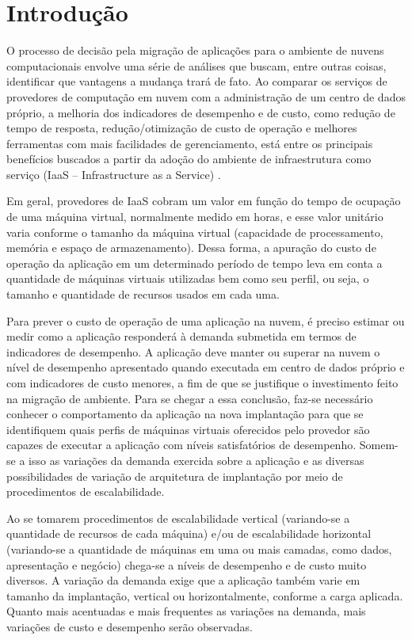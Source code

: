 \chapter[Introdução]{Introdução}
O processo de decisão pela migração de aplicações para o ambiente de nuvens computacionais 
envolve uma série de análises que buscam, entre outras coisas, identificar que vantagens a 
mudança trará de fato. Ao comparar os serviços de provedores de computação em nuvem com a 
administração de um centro de dados próprio, a melhoria dos indicadores de desempenho e de 
custo, como redução de tempo de resposta, redução/otimização de custo de operação e melhores 
ferramentas com mais facilidades de gerenciamento, está entre os principais benefícios buscados 
a partir da adoção do ambiente de infraestrutura como serviço (IaaS – Infrastructure as a Service)
\cite{li2011cloudprophet, rodero2010infrastructure}.

Em geral, provedores de IaaS cobram um valor em função do tempo de ocupação de uma máquina 
virtual, normalmente medido em horas, e esse valor unitário varia conforme o tamanho da máquina 
virtual (capacidade de processamento, memória e espaço de armazenamento). Dessa forma, a apuração 
do custo de operação da aplicação em um determinado período de tempo leva em conta a quantidade 
de máquinas virtuais utilizadas bem como seu perfil, ou seja, o tamanho e quantidade de recursos 
usados em cada uma.
 
Para prever o custo de operação de uma aplicação na nuvem, é preciso estimar ou medir como a 
aplicação responderá à demanda submetida em termos de indicadores de desempenho. A aplicação deve 
manter ou superar na nuvem o nível de desempenho apresentado quando executada em centro de dados 
próprio e com indicadores de custo menores, a fim de que se justifique o investimento feito na 
migração de ambiente. Para se chegar a essa conclusão, faz-se necessário conhecer o comportamento 
da aplicação na nova implantação para que se identifiquem quais perfis de máquinas virtuais 
oferecidos pelo provedor são capazes de executar a aplicação com níveis satisfatórios de desempenho. 
Somem-se a isso as variações da demanda exercida sobre a aplicação e as diversas possibilidades de 
variação de arquitetura de implantação por meio de procedimentos de escalabilidade.
 
Ao se tomarem procedimentos de escalabilidade vertical (variando-se a quantidade de recursos de 
cada máquina) e/ou de escalabilidade horizontal (variando-se a quantidade de máquinas em uma ou 
mais camadas, como dados, apresentação e negócio) chega-se a níveis de desempenho e de custo muito 
diversos. A variação da demanda exige que a aplicação também varie em tamanho da implantação, 
vertical ou horizontalmente, conforme a carga aplicada. Quanto mais acentuadas e mais frequentes 
as variações na demanda, mais variações de custo e desempenho serão observadas.

